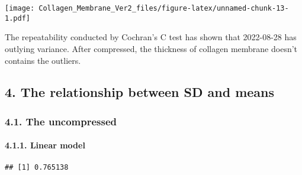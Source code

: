 \documentclass[
]{article}
\newenvironment{Shaded}{\begin{snugshade}}{\end{snugshade}}
\newcommand{\AttributeTok}[1]{\textcolor[rgb]{0.77,0.63,0.00}{#1}}
\newcommand{\FunctionTok}[1]{\textcolor[rgb]{0.00,0.00,0.00}{#1}}
\newcommand{\NormalTok}[1]{#1}
\newcommand{\OtherTok}[1]{\textcolor[rgb]{0.56,0.35,0.01}{#1}}
\newcommand{\SpecialCharTok}[1]{\textcolor[rgb]{0.00,0.00,0.00}{#1}}
\newcommand{\StringTok}[1]{\textcolor[rgb]{0.31,0.60,0.02}{#1}}
\begin{document}
\texttt{[image: Collagen\_Membrane\_Ver2\_files/figure-latex/unnamed-chunk-13-1.pdf]}

The repeatability conducted by Cochran's C test has shown that
2022-08-28 has outlying variance. After compressed, the thickness of
collagen membrane doesn't contains the outliers.

\hypertarget{the-relationship-between-sd-and-means}{%
\subsection{4. The relationship between SD and
means}\label{the-relationship-between-sd-and-means}}

\hypertarget{the-uncompressed-2}{%
\subsubsection{4.1. The uncompressed}\label{the-uncompressed-2}}

\hypertarget{linear-model}{%
\paragraph{4.1.1. Linear model}\label{linear-model}}

\begin{Shaded}
\end{Shaded}

\begin{verbatim}
## [1] 0.765138
\end{verbatim}

\begin{Shaded}
\end{Shaded}
\end{document}
